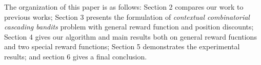 \documentclass{article}
\newcommand{\wei}[1]{}
\newcommand{\wei}[1]{{\color{blue!50!black}  [\text{Wei:} #1]}}
\begin{document}




The organization of this paper is as follows: Section 2 compares our work to previous works; Section 3 presents the formulation of {\it contextual combinatorial cascading bandits} problem with general reward function and position discounts; Section 4 gives our algorithm and main results both on general reward fucntions and two special reward functions; Section 5 demonstrates the experimental results; and section 6 gives a final conclusion.

\end{document}
